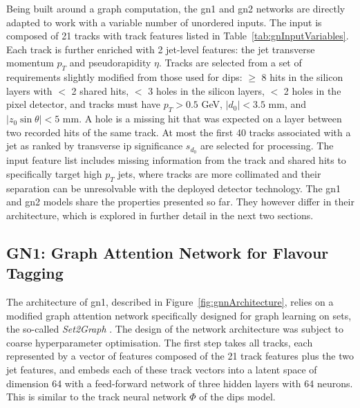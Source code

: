 Being built around a graph computation, the \gls{gn1} and \gls{gn2} networks are directly adapted to work with a variable number of unordered inputs. The input is composed of 21 tracks with track features listed in Table~\ref{tab:gnInputVariables}. Each track is further enriched with 2 jet-level features: the jet transverse momentum $p_T$ and pseudorapidity $\eta$. Tracks are selected from a set of requirements slightly modified from those used for \gls{dips}: $\geq$ 8 hits in the silicon layers with $<$ 2 shared hits, $<$ 3 holes in the silicon layers, $<$ 2 holes in the pixel detector, and tracks must have $p_T > 0.5$ GeV, $|d_0| < 3.5$ mm, and $|z_0 \sin\theta| < 5$ mm. A hole is a missing hit that was expected on a layer between two recorded hits of the same track. At most the first 40 tracks associated with a jet as ranked by transverse \gls{ip} significance $s_{d_0}$ are selected for processing. The input feature list includes missing information from the track and shared hits to specifically target high $p_T$ jets, where tracks are more collimated and their separation can be unresolvable with the deployed detector technology. The \gls{gn1} and \gls{gn2} models share the properties presented so far. They however differ in their architecture, which is explored in further detail in the next two sections.

\subsection{GN1: Graph Attention Network for Flavour Tagging}\label{chap-GN1}
The architecture of \gls{gn1}, described in Figure~\ref{fig:gnnArchitecture}, relies on a modified graph attention network \cite{brody2022how} specifically designed for graph learning on sets, the so-called \textit{Set2Graph} \cite{serviansky2020set2graph}. The design of the network architecture was subject to coarse hyperparameter optimisation. The first step takes all tracks, each represented by a vector of features composed of the 21 track features plus the two jet features, and embeds each of these track vectors into a latent space of dimension 64 with a feed-forward network of three hidden layers with 64 neurons. This is similar to the track neural network $\Phi$ of the \gls{dips} model. \\

